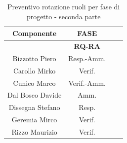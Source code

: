\begin{table}[!h]
	\begin{center}
		  \begin{tabular}
			  {|c|c|c|c|}
			\hline
			\textbf{Componente} & \multicolumn{1}{|c|}{ \textbf{FASE} } \\
			\hline
			& \textbf{RQ-RA} \\
			\hline
			Bizzotto Piero & Resp.-Amm.   \\
			\hline
			Carollo Mirko & Verif.   \\
			\hline
			Cunico Marco & Verif.-Amm.   \\
			\hline
			Dal Bosco Davide & Amm.   \\
			\hline
			Dissegna Stefano & Resp.   \\
			\hline
			Geremia Mirco & Verif.   \\
			\hline
            Rizzo Maurizio  & Verif.\\
			\hline

		\end{tabular}
	\caption{Preventivo rotazione ruoli per fase di progetto - seconda parte} %
	\label{tab:TabellaRotazRuoliDue}
	\end{center}	
\end{table}


